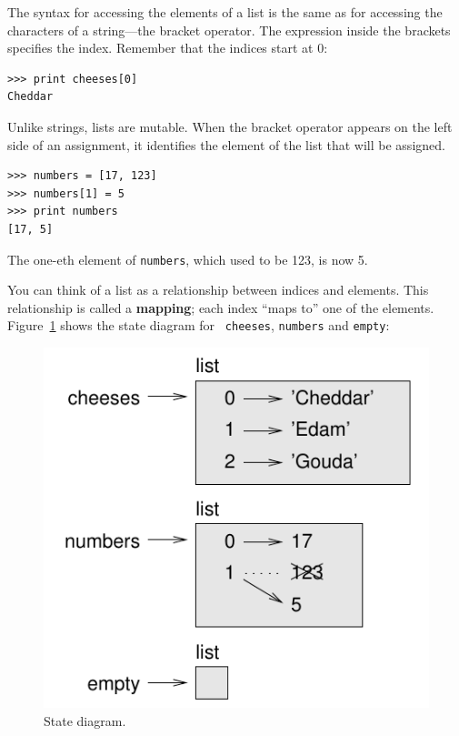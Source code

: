 \documentclass[10pt]{book}
\begin{document}
The syntax for accessing the elements of a list is the same as for
accessing the characters of a string---the bracket operator.  The
expression inside the brackets specifies the index.  Remember that the
indices start at 0:

\begin{verbatim}
>>> print cheeses[0]
Cheddar
\end{verbatim}
%
Unlike strings, lists are mutable.  When the bracket operator appears
on the left side of an assignment, it identifies the element of the
list that will be assigned.

\begin{verbatim}
>>> numbers = [17, 123]
>>> numbers[1] = 5
>>> print numbers
[17, 5]
\end{verbatim}
%
The one-eth element of {\tt numbers}, which
used to be 123, is now 5.

You can think of a list as a relationship between indices and
elements.  This relationship is called a {\bf mapping}; each index
``maps to'' one of the elements.  Figure~\ref{fig.liststate} shows
the state diagram for {\tt
cheeses}, {\tt numbers} and {\tt empty}:

\begin{figure}
\centerline
{\includegraphics[scale=0.8]{figs/liststate.pdf}}
\caption{State diagram.}
\label{fig.liststate}
\end{figure}
\end{document}
